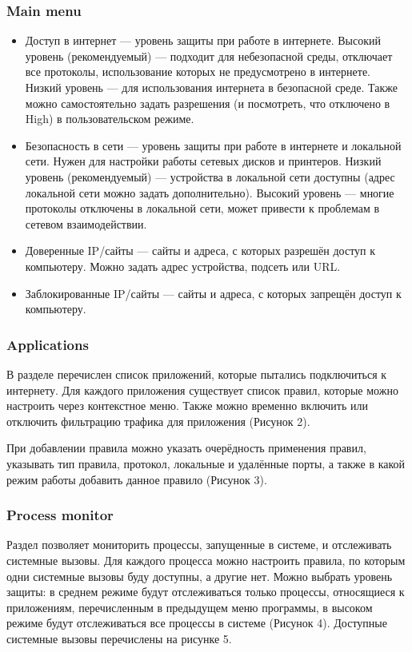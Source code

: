 \subsubsection{Main menu}
\begin{itemize}
    \item Доступ в интернет — уровень защиты при работе в интернете. Высокий уровень (рекомендуемый) — подходит для небезопасной среды, отключает все протоколы, использование которых не предусмотрено в интернете. Низкий уровень — для использования интернета в безопасной среде. Также можно самостоятельно задать разрешения (и посмотреть, что отключено в High) в пользовательском режиме.
    \item Безопасность в сети — уровень защиты при работе в интернете и локальной сети. Нужен для настройки работы сетевых дисков и принтеров. Низкий уровень (рекомендуемый) — устройства в локальной сети доступны (адрес локальной сети можно задать дополнительно). Высокий уровень — многие протоколы отключены в локальной сети, может привести к проблемам в сетевом взаимодействии.
    \item Доверенные IP/сайты — сайты и адреса, с которых разрешён доступ к компьютеру. Можно задать адрес устройства, подсеть или URL.
    \item Заблокированные IP/сайты — сайты и адреса, с которых запрещён доступ к компьютеру.
\end{itemize}

\subsubsection{Applications}
В разделе перечислен список приложений, которые пытались подключиться к интернету. Для каждого приложения существует список правил, которые можно настроить через контекстное меню. Также можно временно включить или отключить фильтрацию трафика для приложения (Рисунок 2).

\FloatBarrier

При добавлении правила можно указать очерёдность применения правил, указывать тип правила, протокол, локальные и удалённые порты, а также в какой режим работы добавить данное правило (Рисунок 3).

\FloatBarrier

\subsubsection{Process monitor}
Раздел позволяет мониторить процессы, запущенные в системе, и отслеживать системные вызовы. Для каждого процесса можно настроить правила, по которым одни системные вызовы буду доступны, а другие нет. Можно выбрать уровень защиты: в среднем режиме будут отслеживаться только процессы, относящиеся к приложениям, перечисленным в предыдущем меню программы, в высоком режиме будут отслеживаться все процессы в системе (Рисунок 4). Доступные системные вызовы перечислены на рисунке 5.

